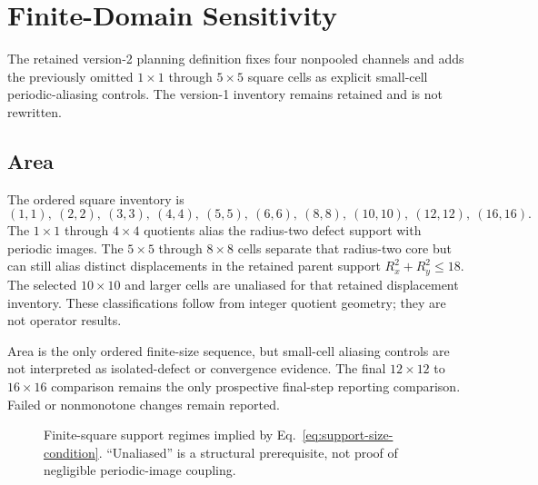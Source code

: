 \documentclass[11pt]{article}
\begin{document}
\section{Finite-Domain Sensitivity}

The retained version-2 planning definition fixes four nonpooled channels and adds the
previously omitted $1\times1$ through $5\times5$ square cells as explicit small-cell
periodic-aliasing controls.  The version-1 inventory remains retained and is not
rewritten.

\subsection{Area}
The ordered square inventory is
\begin{equation}
  (1,1),\ (2,2),\ (3,3),\ (4,4),\ (5,5),\ (6,6),\ (8,8),\
  (10,10),\ (12,12),\ (16,16).
\end{equation}
The $1\times1$ through $4\times4$ quotients alias the radius-two defect support with
periodic images.  The $5\times5$ through $8\times8$ cells separate that radius-two core
but can still alias distinct displacements in the retained parent support
$R_x^2+R_y^2\leq18$.  The selected $10\times10$ and larger cells are unaliased for that
retained displacement inventory.  These classifications follow from integer quotient
geometry; they are not operator results.

Area is the only ordered finite-size sequence, but small-cell aliasing controls are not
interpreted as isolated-defect or convergence evidence.  The final $12\times12$ to
$16\times16$ comparison remains the only prospective final-step reporting comparison.
Failed or nonmonotone changes remain reported.

\begin{figure}[htbp]
  \centering
  \caption{Finite-square support regimes implied by
  Eq.~\eqref{eq:support-size-condition}.  ``Unaliased'' is a structural prerequisite,
  not proof of negligible periodic-image coupling.}
  \label{fig:aliasing-regimes}
\end{figure}
\end{document}
